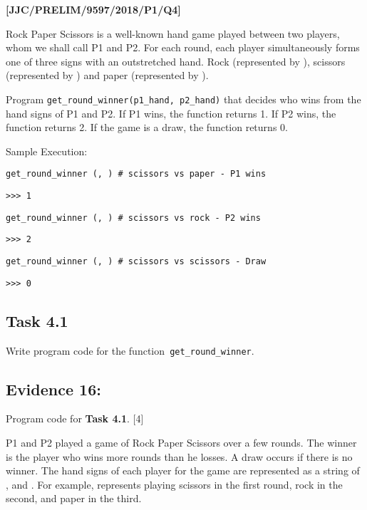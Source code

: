 \item \textbf{{[}JJC/PRELIM/9597/2018/P1/Q4{]} }

Rock Paper Scissors is a well-known hand game played between two players,
whom we shall call P1 and P2. For each round, each player simultaneously
forms one of three signs with an outstretched hand. Rock (represented
by \textquotedbl ), scissors (represented by \textquotedbl )
and paper (represented by \textquotedbl ).

Program \texttt{get\_round\_winner(p1\_hand, p2\_hand)} that decides
who wins from the hand signs of P1 and P2. If P1 wins, the function
returns 1. If P2 wins, the function returns 2. If the game is a draw,
the function returns 0.

Sample Execution:

\noindent\begin{minipage}[t]{1\columnwidth}%
\texttt{get\_round\_winner (\textquotedbl , \textquotedbl )
\# scissors vs paper - P1 wins}

\texttt{>\textcompwordmark >\textcompwordmark > 1}

\texttt{get\_round\_winner (\textquotedbl , \textquotedbl )
\# scissors vs rock - P2 wins }

\texttt{>\textcompwordmark >\textcompwordmark > 2 }

\texttt{get\_round\_winner (\textquotedbl , \textquotedbl )
\# scissors vs scissors - Draw}

\texttt{>\textcompwordmark >\textcompwordmark > 0}%
\end{minipage}

\subsection*{Task 4.1 }

Write program code for the function\texttt{ get\_round\_winner}.

\subsection*{Evidence 16: }

Program code for \textbf{Task 4.1}.\hfill{} {[}4{]}

P1 and P2 played a game of Rock Paper Scissors over a few rounds.
The winner is the player who wins more rounds than he losses. A draw
occurs if there is no winner. The hand signs of each player for the
game are represented as a string of \textquotedbl ,
\textquotedbl{} and \textquotedbl .
For example, \textquotedbl{} represents playing
scissors in the first round, rock in the second, and paper in the
third. 

